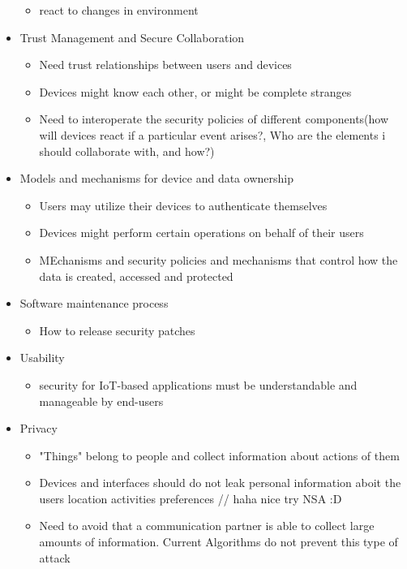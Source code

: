 \documentclass[a4paper, 12pt]{article}
\begin{document}
\begin{itemize}
\begin{itemize}
\item react to changes in environment
\end{itemize}
\item Trust Management and Secure Collaboration
\begin{itemize}
\item Need trust relationships between users and devices
\item Devices might know each other, or might be complete stranges
\item Need to interoperate the security policies of different components(how will devices react if a particular event arises?, Who are the elements i should collaborate with, and how?)
\end{itemize}
\item Models and mechanisms for device and data ownership
\begin{itemize}
\item Users may utilize their devices to authenticate themselves
\item Devices might perform certain operations on behalf of their users
\item MEchanisms and security policies and mechanisms that control how the data is created, accessed and protected
\end{itemize}
\item Software maintenance process
\begin{itemize}
\item How to release security patches
\end{itemize}
\item Usability
\begin{itemize}
\item security for IoT-based applications must be understandable and manageable by end-users
\end{itemize}
\item Privacy
\begin{itemize}
\item "Things" belong to people and collect information about actions of them
\item Devices and interfaces should do not leak personal information aboit the users location activities preferences // haha nice try NSA :D
\item Need to avoid that a communication partner is able to collect large amounts of information. Current Algorithms do not prevent this type of attack
\end{itemize}
\end{itemize}
\end{document}
